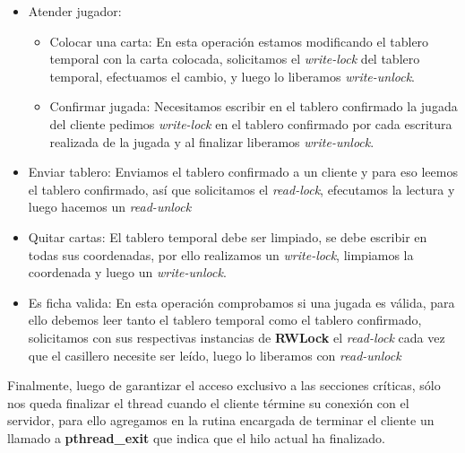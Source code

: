 \begin{itemize}
	\item Atender jugador:
		\begin{itemize}
			\item Colocar una carta: En esta operación estamos modificando el tablero temporal con la carta colocada, solicitamos el \textit{write-lock} del tablero temporal, efectuamos el cambio, y luego lo liberamos \textit{write-unlock}.
			\item Confirmar jugada: Necesitamos escribir en el tablero confirmado la jugada del cliente pedimos \textit{write-lock} en el tablero confirmado por cada escritura realizada de la jugada y al finalizar liberamos \textit{write-unlock}.
		\end{itemize}
	\item Enviar tablero: Enviamos el tablero confirmado a un cliente y para eso leemos el tablero confirmado, así que solicitamos el \textit{read-lock}, efecutamos la lectura y luego hacemos un \textit{read-unlock} 
	\item Quitar cartas: El tablero temporal debe ser limpiado, se debe escribir en todas sus coordenadas, por ello realizamos un \textit{write-lock}, limpiamos la coordenada y luego un \textit{write-unlock}.
	\item Es ficha valida: En esta operación comprobamos si una jugada es válida, para ello debemos leer tanto el tablero temporal como el tablero confirmado, solicitamos con sus respectivas instancias de \textbf{RWLock} el \textit{read-lock} cada vez que el casillero necesite ser leído, luego lo liberamos con \textit{read-unlock}
\end{itemize}

Finalmente, luego de garantizar el acceso exclusivo a las secciones críticas, sólo nos queda finalizar el thread cuando el cliente términe su conexión con el servidor, para ello agregamos en la rutina encargada de terminar el cliente un llamado a \textbf{pthread\_exit} que indica que el hilo actual ha finalizado.

